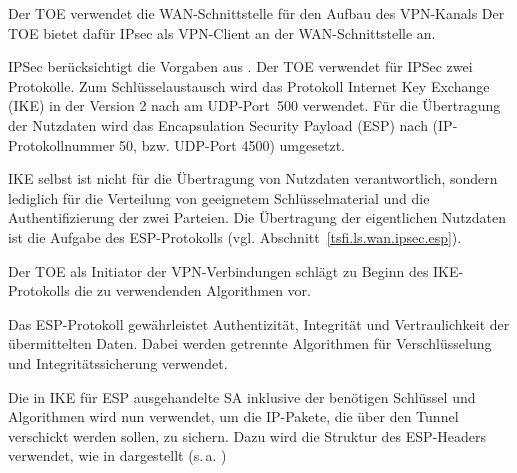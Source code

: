 Der TOE verwendet die WAN-Schnittstelle für den Aufbau des VPN-Kanals Der TOE
bietet dafür IPsec als VPN-Client an der WAN-Schnittstelle an.



IPSec berücksichtigt die Vorgaben aus . Der TOE verwendet
für IPSec zwei Protokolle. Zum Schlüsselaustausch wird das Protokoll
Internet Key Exchange (IKE) in der Version 2 nach 
am UDP-Port~500 verwendet. Für die Übertragung der Nutzdaten wird das
Encapsulation Security Payload (ESP) nach 
(IP-Protokollnummer 50, bzw. UDP-Port 4500) umgesetzt.


IKE selbst ist nicht für die Übertragung von Nutzdaten verantwortlich, sondern
lediglich für die Verteilung von geeignetem Schlüsselmaterial und die
Authentifizierung der zwei Parteien. Die Übertragung der eigentlichen Nutzdaten
ist die Aufgabe des ESP-Protokolls
(vgl. Abschnitt~\vref{tsfi.ls.wan.ipsec.esp}).

Der TOE als Initiator der VPN-Verbindungen schlägt zu Beginn des IKE-Protokolls
die zu verwendenden Algorithmen vor.



Das ESP-Protokoll gewährleistet Authentizität, Integrität und
Vertraulichkeit der übermittelten Daten. Dabei werden getrennte
Algorithmen für Verschlüsselung und Integritätssicherung verwendet.

Die in IKE für ESP ausgehandelte SA inklusive der benötigen Schlüssel
und Algorithmen wird nun verwendet, um die IP-Pakete, die über den
Tunnel verschickt werden sollen, zu sichern. Dazu wird die Struktur
des ESP-Headers verwendet, wie in
 dargestellt
(s.\,a. \cite[Figure~2]{rfc4303})


